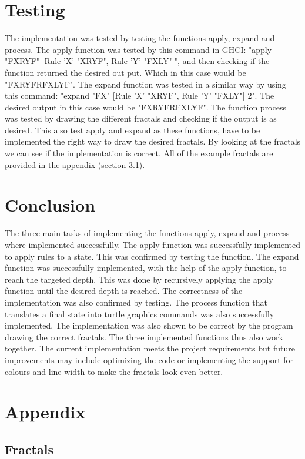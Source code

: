 \documentclass{article}
\begin{document}
\section{Testing}
The implementation was tested by testing the functions apply, expand and process. The apply function was tested by this command in GHCI: "apply "FXRYF" [Rule ’X’ "XRYF", Rule ’Y’ "FXLY"]", and then checking if the function returned the desired out put. Which in this case would be "FXRYFRFXLYF". The expand function was tested in a similar way by using this command: "expand "FX" [Rule ’X’ "XRYF", Rule ’Y’ "FXLY"] 2". The desired output in this case would be "FXRYFRFXLYF". The function process was tested by drawing the different fractals and checking if the output is as desired. This also test apply and expand as these functions, have to be implemented the right way to draw the desired fractals. By looking at the fractals we can see if the implementation is correct. All of the example fractals are provided in the appendix (section \ref{Fractals}).

\section{Conclusion}
The three main tasks of implementing the functions apply, expand and process where implemented successfully. The apply function was successfully implemented to apply rules to a state. This was confirmed by testing the function. The expand function was successfully implemented, with the help of the apply function, to reach the targeted depth. This was done by recursively applying the apply function until the desired depth is reached. The correctness of the implementation was also confirmed by testing. The process function that translates a final state into turtle graphics commands was also successfully implemented. The implementation was also shown to be correct by the program drawing the correct fractals. The three implemented functions thus also work together. The current implementation meets the project requirements but future improvements may include optimizing the code or implementing the support for colours and line width to make the fractals look even better.


\section{Appendix}

\subsection{Fractals} \label{Fractals}
\end{document}
